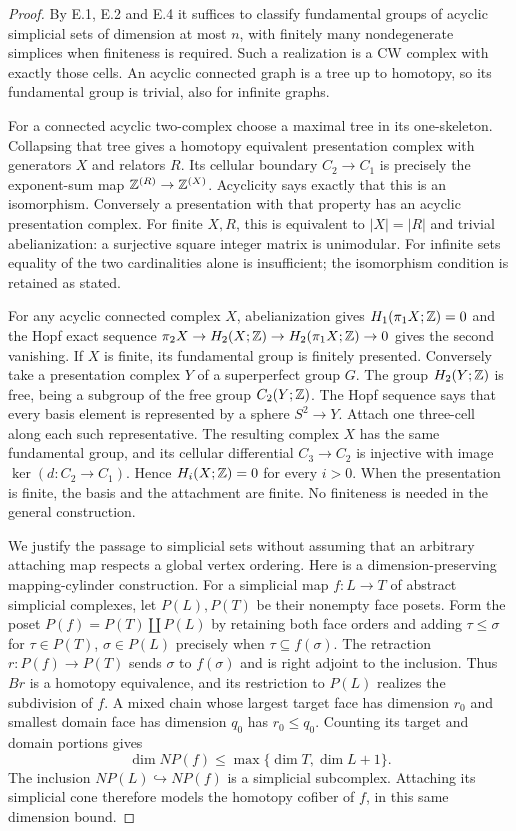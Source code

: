 \begin{proof}
By E.1, E.2 and E.4 it suffices to classify fundamental groups
of acyclic simplicial sets of dimension at most $n$, with finitely
many nondegenerate simplices when finiteness is required. Such a
realization is a CW complex with exactly those cells. An acyclic
connected graph is a tree up to homotopy, so its fundamental group
is trivial, also for infinite graphs.

For a connected acyclic two-complex choose a maximal tree in its
one-skeleton. Collapsing that tree gives a homotopy equivalent
presentation complex with generators $X$ and relators $R$.
Its cellular boundary $C_2\to C_1$ is precisely the exponent-sum
map $\mathbb Z^{(R)}\to\mathbb Z^{(X)}$. Acyclicity says exactly that this is
an isomorphism. Conversely a presentation with that property has
an acyclic presentation complex. For finite $X,R$, this is
equivalent to $|X|=|R|$ and trivial abelianization: a surjective
square integer matrix is unimodular. For infinite sets equality
of the two cardinalities alone is insufficient; the isomorphism
condition is retained as stated.

For any acyclic connected complex $X$, abelianization gives
$H_1(\pi_1X;\mathbb Z)=0$ and the Hopf exact sequence
$\pi_2X\to H_2(X;\mathbb Z)\to H_2(\pi_1X;\mathbb Z)\to0$ gives the
second vanishing. If $X$ is finite, its fundamental group is
finitely presented. Conversely take a presentation complex $Y$
of a superperfect group $G$. The group $H_2(Y;\mathbb Z)$ is free,
being a subgroup of the free group $C_2(Y;\mathbb Z)$. The Hopf sequence
says that every basis element is represented by a sphere
$S^2\to Y$. Attach one three-cell along each such representative.
The resulting complex $X$ has the same fundamental group, and
its cellular differential $C_3\to C_2$ is injective with image
$\ker(d:C_2\to C_1)$. Hence $H_i(X;\mathbb Z)=0$ for every $i>0$.
When the presentation is finite, the basis and the attachment
are finite. No finiteness is needed in the general construction.

We justify the passage to simplicial sets without assuming that
an arbitrary attaching map respects a global vertex ordering.
Here is a dimension-preserving mapping-cylinder construction.
For a simplicial map $f:L\to T$ of abstract simplicial complexes,
let $P(L),P(T)$ be their nonempty face posets. Form the poset
$P(f)=P(T)\amalg P(L)$ by retaining both face orders and adding
$\tau\leq\sigma$ for $\tau\in P(T)$, $\sigma\in P(L)$ precisely
when $\tau\subseteq f(\sigma)$. The retraction
$r:P(f)\to P(T)$ sends $\sigma$ to $f(\sigma)$ and is right
adjoint to the inclusion. Thus $Br$ is a homotopy equivalence,
and its restriction to $P(L)$ realizes the subdivision of $f$.
A mixed chain whose largest target face has dimension $r_0$ and
smallest domain face has dimension $q_0$ has $r_0\leq q_0$.
Counting its target and domain portions gives
\[
 \dim NP(f)\leq\max\{\dim T,\dim L+1\}.
\]
The inclusion $NP(L)\hookrightarrow NP(f)$ is a simplicial
subcomplex. Attaching its simplicial cone therefore models the
homotopy cofiber of $f$, in this same dimension bound.


\end{proof}
